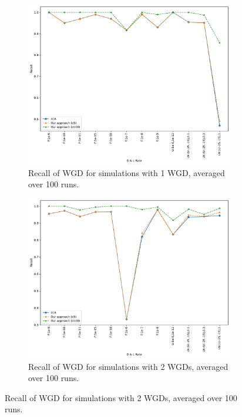\documentclass[10pt]{article}
\begin{document}
\begin{figure}[h!]
    \centering
    \begin{subfigure}[b]{0.48\textwidth}
        \centering
        \includegraphics[width=\textwidth]{figs/recall-WGD-t10-t80-Avg.pdf}
        \caption{Recall of WGD for simulations with 1 WGD, averaged over 100 runs.}
        \label{fig:recall-wgd-1wgd_old}
    \end{subfigure}
    \hfill
    \begin{subfigure}[b]{0.48\textwidth}
        \centering
        \includegraphics[width=\textwidth]{figs/recall-2W-WGD-t20-t80-Avg.pdf}
        \caption{Recall of WGD for simulations with 2 WGDs, averaged over 100 runs.}
        \label{fig:recall-wgd-2wgd}
    \end{subfigure}
    

\end{figure}
\end{document}
